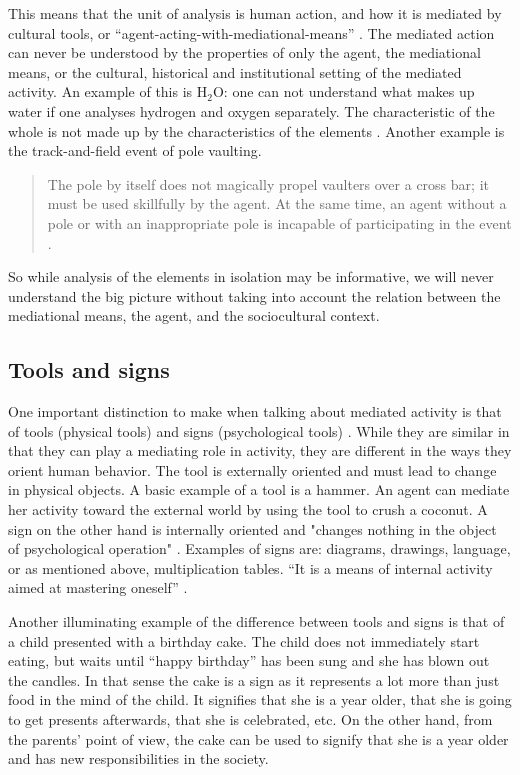 This means that the unit of analysis is human action, and how it is mediated by cultural tools, or “agent-acting-with-mediational-means” \citep[\citealp{wertsch1993sociocultural} referenced in][]{wertsch1998mind}. The mediated action can never be understood by the properties of only the agent, the mediational means, or the cultural, historical and institutional setting of the mediated activity. An example of this is $\text{H}_2\text{O}$: one can not understand what makes up water if one analyses hydrogen and oxygen separately. The characteristic of the whole is not made up by the characteristics of the elements \citep{vygotskiui1978mind}. Another example is the track-and-field event of pole vaulting. 
\begin{quote}
The pole by itself does not magically propel vaulters over a cross bar; it must be used skillfully by the agent. At the same time, an agent without a pole or with an inappropriate pole is incapable of participating in the event \citep[p. 27]{wertsch1998mind}. 
\end{quote}
So while analysis of the elements in isolation may be informative, we will never understand the big picture without taking into account the relation between the mediational means, the agent, and the sociocultural context. 

\subsection{Tools and signs}
One important distinction to make when talking about mediated activity is that of tools (physical tools) and signs (psychological tools) \citep{vygotskiui1978mind}. While they are similar in that they can play a mediating role in activity, they are different in the ways they orient human behavior. The tool is externally oriented and must lead to change in physical objects. A basic example of a tool is a hammer. An agent can mediate her activity toward the external world by using the tool to crush a coconut. A sign on the other hand is internally oriented and "changes nothing in the object of psychological operation" \citep[p. 55]{vygotskiui1978mind}. Examples of signs are: diagrams, drawings, language, or as mentioned above, multiplication tables. “It is a means of internal activity aimed at mastering oneself” \citep[p. 55]{vygotskiui1978mind}. 

Another illuminating example of the difference between tools and signs is that of a child presented with a birthday cake. The child does not immediately start eating, but waits until “happy birthday” has been sung and she has blown out the candles. In that sense the cake is a sign as it represents a lot more than just food in the mind of the child. It signifies that she is a year older, that she is going to get presents afterwards, that she is celebrated, etc. On the other hand, from the parents’ point of view, the cake can be used to signify that she is a year older and has new responsibilities in the society. 

